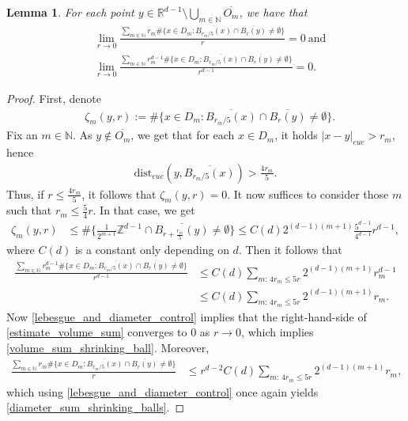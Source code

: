 \documentclass[a4paper,10pt]{article}
\newtheorem{lemma}[theorem]{Lemma}
\numberwithin{equation}{section}
\newcommand{\R}{\mathbb{R}}
\newcommand{\N}{\mathbb{N}}
\newcommand{\Z}{\mathbb{Z}}
\newcommand{\dist}{\mathrm{dist}}
\begin{document}
\begin{lemma}\label{shrinking_ball_om_behaviour}
    For each point $y \in \R^{d-1} \setminus \bigcup_{m\in \N} \overline{O_m}$, we have that 
    \begin{align}
        &\lim_{r \to 0} \frac{\sum_{m \in \N}r_m\#\{x \in D_m: \overline{B_{r_m/5}(x)} \cap \overline{B_r(y)}\neq \emptyset\}}{r} =0 \ \mathrm{and} \label{diameter_sum_shrinking_balls} \\
        &\lim_{r \to 0} \frac{\sum_{m \in \N}r^{d-1}_m\#\{x \in D_m: \overline{B_{r_m/5}(x)} \cap \overline{B_r(y)}\neq \emptyset\}}{r^{d-1}} =0. \label{volume_sum_shrinking_ball}
    \end{align}
\end{lemma}
\begin{proof}
    First, denote 
    \begin{align}
        &\zeta_{m}(y, r):= \#\{x \in D_m: \overline{B_{r_m/5}(x)} \cap \overline{B_r(y)}\neq \emptyset\}.
    \end{align}
    Fix an $m \in \N$.
    As $y \notin \overline{O_m}$, we get that for each $x \in D_m$, it holds $|x-y|_{euc} > r_m$, hence 
    \begin{align}
        \dist_{euc}(y, \overline{B_{r_m/5}(x)}) > \frac{4r_m}{5}.
    \end{align}
Thus, if $r \leq \frac{4r_m}{5}$, it follows that $\zeta_m(y, r) =0$. It now suffices to consider those $m$ such that $r_m \leq \frac{5}{4}r$. In that case, we get 
    \begin{align*}
        \zeta_m(y,r) &\leq \#\big\{ \frac{1}{2^{m+1}}\Z^{d-1} \cap \overline{B_{r+\frac{r_m}{5}}(y)} \neq \emptyset\big\} \leq C(d) 2^{(d-1)(m+1)} \frac{5^{d-1}}{4^{d-1}} r^{d-1},
    \end{align*}
    where $C(d)$ is a constant only depending on $d$. Then it follows that 
    \begin{align}
        \frac{\sum_{m \in \N}r^{d-1}_m\#\{x \in D_m: \overline{B_{r_m/5}(x)} \cap \overline{B_r(y)}\neq \emptyset\}}{r^{d-1}} &\leq C(d)\sum_{m:\, 4r_m \leq 5r} 2^{(d-1)(m+1)}r_m^{d-1} \nonumber\\
        &\leq C(d)\sum_{m:\, 4r_m \leq 5r} 2^{(d-1)(m+1)}r_m. \label{estimate_volume_sum}
    \end{align}
    Now \eqref{lebesgue_and_diameter_control} implies that the right-hand-side of \eqref{estimate_volume_sum} converges to $0$ as $r \to 0$, which implies \eqref{volume_sum_shrinking_ball}.
    Moreover, 
    \begin{align}
        \frac{\sum_{m \in \N}r_m\#\{x \in D_m: \overline{B_{r_m/5}(x)} \cap \overline{B_r(y)}\neq \emptyset\}}{r} &\leq r^{d-2}C(d)\sum_{m:\, 4r_m \leq 5r} 2^{(d-1)(m+1)}r_m, 
    \end{align}
    which using \eqref{lebesgue_and_diameter_control} once again yields \eqref{diameter_sum_shrinking_balls}.
\end{proof}
\end{document}
